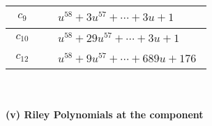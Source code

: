 \documentclass[1p]{elsarticle_modified}
\theoremstyle{definition}
\begin{document}
\begin{tabular}{m{50pt}|m{274pt}}
\hline $$\begin{aligned}c_{9}\end{aligned}$$&$\begin{aligned}
&u^{58}+3 u^{57}+\cdots+3 u+1
\end{aligned}$\\
\hline $$\begin{aligned}c_{10}\end{aligned}$$&$\begin{aligned}
&u^{58}+29 u^{57}+\cdots+3 u+1
\end{aligned}$\\
\hline $$\begin{aligned}c_{12}\end{aligned}$$&$\begin{aligned}
&u^{58}+9 u^{57}+\cdots+689 u+176
\end{aligned}$\\
\hline
\end{tabular}\\~\\
\newpage\renewcommand{\arraystretch}{1}
\flushleft \textbf{(v) Riley Polynomials at the component}\newline \\
\end{document}
